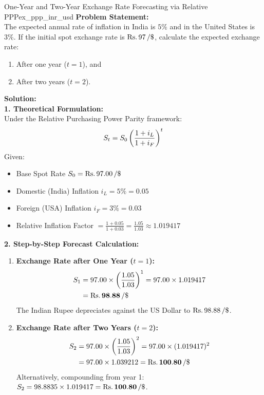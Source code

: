 \begin{example}{One-Year and Two-Year Exchange Rate Forecasting via Relative PPP}{ex_ppp_inr_usd}
\textbf{Problem Statement:}\\
The expected annual rate of inflation in India is $5\%$ and in the United States is $3\%$. If the initial spot exchange rate is $\inr 97\,/\$$, calculate the expected exchange rate:
\begin{enumerate}[label=(\alph*), noitemsep]
    \item After one year ($t=1$), and
    \item After two years ($t=2$).
\end{enumerate}

\tcblower
\textbf{Solution:}\\
\noindent\textbf{1. Theoretical Formulation:}\\
Under the Relative Purchasing Power Parity framework:
\begin{equation*}
    S_t = S_0 \left( \frac{1 + i_L}{1 + i_F} \right)^t
\end{equation*}
Given:
\begin{itemize}[leftmargin=*, noitemsep]
    \item Base Spot Rate $\Spot_0 = \inr 97.00\,/\$$
    \item Domestic (India) Inflation $i_L = 5\% = 0.05$
    \item Foreign (USA) Inflation $i_F = 3\% = 0.03$
    \item Relative Inflation Factor $= \frac{1 + 0.05}{1 + 0.03} = \frac{1.05}{1.03} \approx 1.019417$
\end{itemize}

\noindent\textbf{2. Step-by-Step Forecast Calculation:}
\begin{enumerate}[label=(\alph*), leftmargin=*]
    \item \textbf{Exchange Rate after One Year ($t=1$):}
    \begin{align*}
        S_1 &= 97.00 \times \left( \frac{1.05}{1.03} \right)^1 = 97.00 \times 1.019417 \\
                &= \mathbf{\text{Rs.}\, 98.88\,/\$}
    \end{align*}
    The Indian Rupee depreciates against the US Dollar to $\inr 98.88\,/\$$.

    \item \textbf{Exchange Rate after Two Years ($t=2$):}
    \begin{align*}
        S_2 &= 97.00 \times \left( \frac{1.05}{1.03} \right)^2 = 97.00 \times (1.019417)^2 \\
                &= 97.00 \times 1.039212 = \mathbf{\text{Rs.}\, 100.80\,/\$}
    \end{align*}
    Alternatively, compounding from year 1: $S_2 = 98.8835 \times 1.019417 = \mathbf{\text{Rs.}\, 100.80\,/\$}$.
\end{enumerate}
\end{example}


